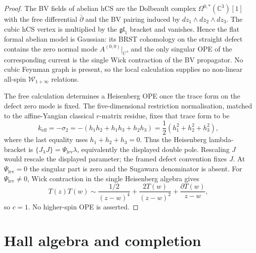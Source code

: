 \documentclass[11pt]{amsart}
\providecommand{\bC}{\mathbb{C}}
\providecommand{\cW}{\mathcal{W}}
\theoremstyle{definition}
\theoremstyle{remark}
\begin{document}
\begin{proof}
The BV fields of abelian hCS are the Dolbeault complex
\(\Omega^{0,*}(\bC^3)[1]\) with the free differential \(\bar\partial\) and
the BV pairing induced by \(dz_1\wedge dz_2\wedge dz_3\). The cubic hCS
vertex is multiplied by the \(\mathfrak{gl}_1\) bracket and vanishes. Hence
the flat formal abelian model is Gaussian: its BRST cohomology on the
straight defect contains the zero normal mode \(A^{(0,0)}|_C\), and the
only singular OPE of the corresponding current is the single Wick
contraction of the BV propagator. No cubic Feynman graph is present, so
the local calculation supplies no non-linear all-spin
\(\cW_{1+\infty}\) relations.

The free calculation determines a Heisenberg OPE once the trace form on
the defect zero mode is fixed. The five-dimensional restriction
normalisation, matched to the affine-Yangian classical \(r\)-matrix
residue, fixes that trace form to be
\[
        k_{\mathrm{eff}}
        =-\sigma_2
        =-(h_1h_2+h_1h_3+h_2h_3)
        =\frac{1}{2}(h_1^2+h_2^2+h_3^2),
\]
where the last equality uses \(h_1+h_2+h_3=0\). Thus the Heisenberg
lambda-bracket is \(\{J_\lambda J\}=\Psi_{\mathrm{lev}}\lambda\), equivalently the
displayed double pole. Rescaling \(J\) would rescale the displayed
parameter; the framed defect convention fixes \(J\). At
\(\Psi_{\mathrm{lev}}=0\) the
singular part is zero and the Sugawara denominator is absent. For
\(\Psi_{\mathrm{lev}}\neq0\), Wick contraction in the single Heisenberg algebra gives
\[
        T(z)T(w)\sim
        \frac{1/2}{(z-w)^4}
        +\frac{2T(w)}{(z-w)^2}
        +\frac{\partial T(w)}{z-w},
\]
so \(c=1\). No higher-spin OPE is asserted.
\end{proof}

\section{Hall algebra and completion}
\end{document}
